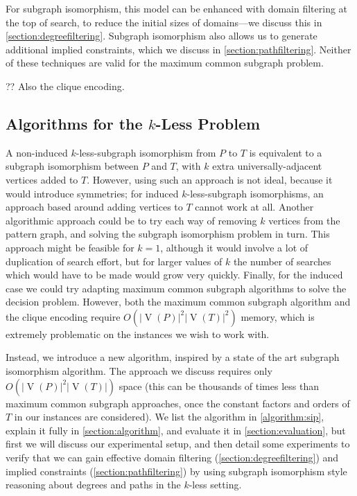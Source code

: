 \documentclass[letterpaper]{article}
\theoremstyle{definition}
\newcommand{\V}{\operatorname{V}}
\begin{document}
For subgraph isomorphism, this model can be enhanced with domain filtering at the top of search, to
reduce the initial sizes of domains---we discuss this in \cref{section:degreefiltering}. Subgraph
isomorphism also allows us to generate additional implied constraints, which we discuss in
\cref{section:pathfiltering}. Neither of these techniques are valid for the maximum common subgraph
problem.

?? Also the clique encoding.

\subsection{Algorithms for the $k$-Less Problem}

A non-induced $k$-less-subgraph isomorphism from $P$ to $T$ is equivalent to a subgraph isomorphism
between $P$ and $T$, with $k$ extra universally-adjacent vertices added to $T$. However, using such
an approach is not ideal, because it would introduce symmetries; for induced $k$-less-subgraph
isomorphisms, an approach based around adding vertices to $T$ cannot work at all.
Another algorithmic approach could be to try each way of removing $k$ vertices from the pattern
graph, and solving the subgraph isomorphism problem in turn. This approach might be feasible for $k
= 1$, although it would involve a lot of duplication of search effort, but for larger values of $k$
the number of searches which would have to be made would grow very quickly.
Finally, for the induced case we could try adapting maximum common subgraph algorithms to solve the
decision problem. However, both the maximum common subgraph algorithm and the clique encoding
require $O(\left|\V(P)\right|^2\left|\V(T)\right|^2)$ memory, which is extremely problematic on the
instances we wish to work with.

Instead, we introduce a new algorithm, inspired by a state of the art subgraph isomorphism
algorithm. The approach we discuss requires only $O(\left|\V(P)\right|^2\left|\V(T)\right|)$ space
(this can be thousands of times less than maximum common subgraph approaches, once the constant
factors and orders of $T$ in our instances are considered). We list the algorithm in
\cref{algorithm:sip}, explain it fully in \cref{section:algorithm}, and evaluate it in
\cref{section:evaluation}, but first we will discuss our experimental setup, and then detail some
experiments to verify that we can gain effective domain filtering (\cref{section:degreefiltering})
and implied constraints (\cref{section:pathfiltering}) by using subgraph isomorphism style reasoning
about degrees and paths in the $k$-less setting.
\end{document}
